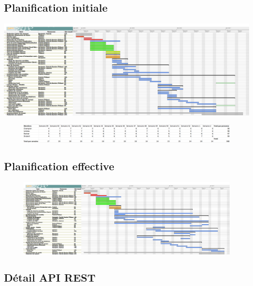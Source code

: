 \documentclass[french]{article}
\begin{document}
		\subsection{Planification initiale}
		
			
			
			\includegraphics[angle=90,width=\linewidth,height=\textheight]{../diagramme-de-gantt/diagramme-de-gantt.png}
			\begin{figure}[H]
				\centering
				\includegraphics[angle=90,height=\textheight]{../diagramme-de-gantt/tableau-heures-personnes}
			\end{figure}
			\justifying 
		\subsection{Planification effective}
			\begin{figure}[H]
				\centering
				\includegraphics[angle=90,width=\linewidth,height=\textheight]{../diagramme-de-gantt/gantt2.png}
			\end{figure}
		\subsection{Détail API REST}
			
			
\end{document}
